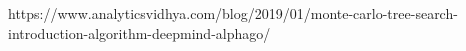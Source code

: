 https://www.analyticsvidhya.com/blog/2019/01/monte-carlo-tree-search-introduction-algorithm-deepmind-alphago/
